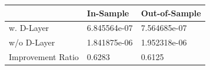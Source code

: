 \begin{tabular}{lll}
\toprule
 & In-Sample & Out-of-Sample \\
\midrule
w. D-Layer & 6.845564e-07 & 7.564685e-07 \\
w/o D-Layer & 1.841875e-06 & 1.952318e-06 \\
Improvement Ratio & 0.6283 & 0.6125 \\
\bottomrule
\end{tabular}
